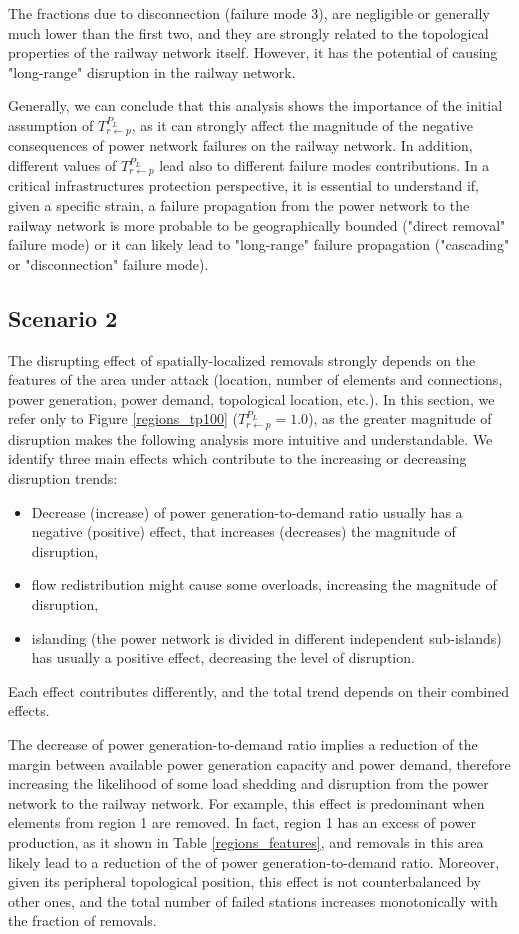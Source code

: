 \documentclass[review]{elsarticle}
\begin{document}
	The fractions due to disconnection (failure mode 3), are negligible or generally much lower than the first two, and they are strongly related to the topological properties of the railway network itself. However, it has the potential of causing "long-range" disruption in the railway network.
	
	Generally, we can conclude that this analysis shows the importance of the initial assumption of $T_{r \leftarrow p}^{P_L}$, as it can strongly affect the magnitude of the negative consequences of power network failures on the railway network. In addition, different values of $T_{r \leftarrow p}^{P_L}$ lead also to different failure modes contributions. In a critical infrastructures protection perspective, it is essential to understand if, given a specific strain, a failure propagation from the power network to the railway network is more probable to be geographically bounded ("direct removal" failure mode) or it can likely lead to "long-range" failure propagation ("cascading" or "disconnection" failure mode).
	
\subsection{Scenario 2}
	The disrupting effect of spatially-localized removals strongly depends on the features of the area under attack (location, number of elements and connections, power generation, power demand, topological location, etc.). In this section, we refer only to Figure \ref{regions_tp100} ($T_{r \leftarrow p}^{P_L}=1.0$), as the greater magnitude of disruption makes the following analysis more intuitive and understandable. We identify three main effects which contribute to the increasing or decreasing disruption trends:
	\begin{itemize}
	    \item Decrease (increase) of power generation-to-demand ratio usually has a negative (positive) effect, that increases (decreases) the magnitude of disruption,
	    \item flow redistribution might cause some overloads, increasing the magnitude of disruption,
	    \item islanding (the power network is divided in different independent sub-islands) has usually a positive effect, decreasing the level of disruption.
	\end{itemize}
	Each effect contributes differently, and the total trend depends on their combined effects.
	
	The decrease of power generation-to-demand ratio implies a reduction of the margin between available power generation capacity and power demand, therefore increasing the likelihood of some load shedding and disruption from the power network to the railway network. For example, this effect is predominant when elements from region 1 are removed. In fact, region 1 has an excess of power production, as it shown in Table \ref{regions_features}, and removals in this area likely lead to a reduction of the of power generation-to-demand ratio. Moreover, given its peripheral topological position, this effect is not counterbalanced by other ones, and the total number of failed stations increases monotonically with the fraction of removals.
	
\end{document}
